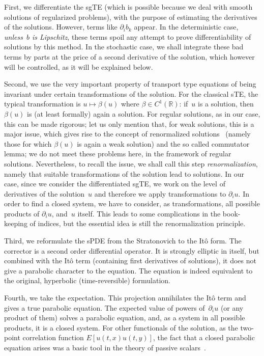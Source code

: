 \documentclass[a4paper,10pt]{article}
\newcommand\1{\mathbbm{1}}
\numberwithin{equation}{section}
\begin{document}
First, we differentiate the sgTE (which is possible because we deal with smooth solutions of regularized problems), with the purpose of estimating the derivatives of the solutions. However, terms like $\partial_{i}b_{k}$ appear. In the deterministic case, \emph{unless~$b$ is Lipschitz}, these terms spoil any attempt to prove differentiability of solutions by this method. In the stochastic case, we shall integrate these bad terms by parts at the price of a second derivative of the solution, which however will be controlled, as it will be explained below.

Second, we use the very important property of transport type equations of being invariant under certain transformations of the solution. For the classical sTE, the typical transformation is $u \mapsto \beta(u)$ where $\beta\in C^{1}(\mathbb{R})$: if~$u$ is a solution, then $\beta(u)$ is (at least formally) again a solution. For
regular solutions, as in our case, this can be made rigorous; let us only mention that, for weak solutions, this is a major issue, which gives rise to the
concept of renormalized solutions~\cite{DIPELI89} (namely those for which $\beta(u)$ is again a weak solution) and the so called commutator lemma; we
do not meet these problems here, in the framework of regular solutions. Nevertheless, to recall the issue, we shall call this step \emph{renormalization}, namely that suitable transformations of the solution lead to solutions. In our case, since we consider the differentiated sgTE, we work on the level of derivatives of the solution~$u$ and therefore we apply transformations to $\partial_{i}u$. In order to find a closed system, we have to consider, as transformations, all possible products of $\partial_{i}u$, and~$u$ itself. This leads to some complications in the book-keeping of indices, but the essential idea is still the renormalization principle.

Third, we reformulate the sPDE from the Stratonovich to the It\^{o} form. The corrector is a second order differential operator. It is strongly elliptic in itself, but combined with the It\^{o} term (containing first derivatives of solutions), it does not give a parabolic character to the equation. The equation is indeed equivalent to the original, hyperbolic (time-reversible) formulation.

Fourth, we take the expectation. This projection annihilates the It\^{o} term and gives a true parabolic equation. The expected value of powers of~$\partial_{i}u$ (or any product of them) solves a parabolic equation, and, as a system in all possible products, it is a closed system. For other functionals of the solution, as the two-point correlation function $E[u(t,x)  u(t,y)]$, the fact that a closed parabolic equation arises was a basic tool in the theory of passive scalars~\cite{CHAGAWHORKUPVER03}.
\end{document}
